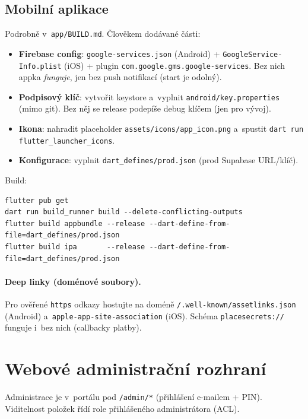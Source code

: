 \documentclass[11pt,a4paper]{article}
\newcommand{\code}[1]{\texttt{#1}}
\begin{document}
\subsection{Mobilní aplikace}
Podrobně v~\code{app/BUILD.md}. Člověkem dodávané části:
\begin{itemize}[nosep]
  \item \textbf{Firebase config}: \code{google-services.json} (Android) +
        \code{GoogleService-Info.plist} (iOS) + plugin \code{com.google.gms.google-services}.
        Bez nich appka \emph{funguje}, jen bez push notifikací (start je odolný).
  \item \textbf{Podpisový klíč}: vytvořit keystore a~vyplnit \code{android/key.properties}
        (mimo git). Bez něj se release podepíše debug klíčem (jen pro vývoj).
  \item \textbf{Ikona}: nahradit placeholder \code{assets/icons/app\_icon.png} a~spustit
        \code{dart run flutter\_\allowbreak launcher\_\allowbreak icons}.
  \item \textbf{Konfigurace}: vyplnit \code{dart\_defines/prod.json} (prod Supabase URL/klíč).
\end{itemize}
Build:
\begin{lstlisting}
flutter pub get
dart run build_runner build --delete-conflicting-outputs
flutter build appbundle --release --dart-define-from-file=dart_defines/prod.json
flutter build ipa       --release --dart-define-from-file=dart_defines/prod.json
\end{lstlisting}

\paragraph{Deep linky (doménové soubory).} Pro ověřené \code{https} odkazy hostujte
na doméně \code{/.well-known/\allowbreak assetlinks.json} (Android)
a~\code{apple-app-\allowbreak site-association} (iOS). Schéma \code{placesecrets://}
funguje i~bez nich (callbacky platby).

\section{Webové administrační rozhraní}
Administrace je v~portálu pod \code{/admin/*} (přihlášení e-mailem + PIN).
Viditelnost položek řídí role přihlášeného administrátora (ACL).
\end{document}
